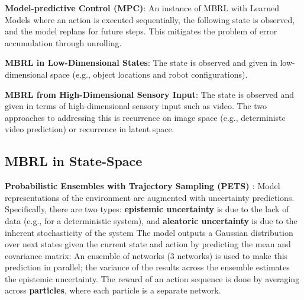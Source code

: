 \documentclass{article}
\begin{document}
  \textbf{Model-predictive Control (MPC)}: An instance of MBRL with Learned Models where an action is executed sequentially, the following state is observed, and the model replans for future steps. This mitigates the problem of error accumulation through unrolling. 

  \textbf{MBRL in Low-Dimensional States}: The state is observed and given in low-dimensional space (e.g., object locations and robot configurations).  

  \textbf{MBRL from High-Dimensional Sensory Input}: The state is observed and given in terms of high-dimensional sensory input such as video. The two approaches to addressing this is recurrence on image space (e.g., deterministc video prediction) or recurrence in latent space. 

\subsection{MBRL in State-Space}

  \textbf{Probabilistic Ensembles with Trajectory Sampling (PETS) \cite{chua2018deep}}: Model representations of the environment are augmented with uncertainty predictions. Specifically, there are two types: \textbf{epistemic uncertainty} is due to the lack of data (e.g., for a deterministic system), and \textbf{aleatoric uncertainty} is due to the inherent stochasticity of the system The model outputs a Gaussian distribution over next states given the current state and action by predicting the mean and covariance matrix:
  An ensemble of networks ($3$ networks) is used to make this prediction in parallel; the variance of the results across the ensemble estimates the epistemic uncertainty. The reward of an action sequence is done by averaging across \textbf{particles}, where each particle is a separate network.
\end{document}

